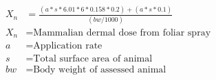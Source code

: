 \documentclass[fleqn, oneside, 11pt]{article}%
\begin{document}
\begin{preview}
\begin{align*}%
X_{n} & = \frac{\left(a*s*6.01*6*0.158*0.2\right)+\left(a*s*0.1\right)}{\left(bw/1000\right)} \nonumber \\
X_{n} & =  \text{Mammalian dermal dose from foliar spray} \nonumber \\
a & =  \text{Application rate} \nonumber \\
s & =  \text{Total surface area of animal} \nonumber \\
bw & =  \text{Body weight of assessed animal} \nonumber \\
\end{align*} 
\end{preview}
\end{document}
